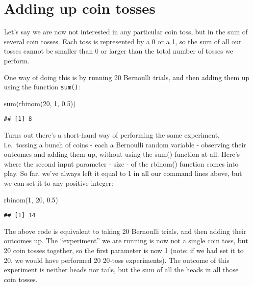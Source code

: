 \documentclass[
]{book}
\newenvironment{Shaded}{\begin{snugshade}}{\end{snugshade}}
\newcommand{\DecValTok}[1]{\textcolor[rgb]{0.00,0.00,0.81}{#1}}
\newcommand{\FloatTok}[1]{\textcolor[rgb]{0.00,0.00,0.81}{#1}}
\newcommand{\FunctionTok}[1]{\textcolor[rgb]{0.00,0.00,0.00}{#1}}
\newcommand{\NormalTok}[1]{#1}
\begin{document}
\hypertarget{adding-up-coin-tosses}{%
\section{Adding up coin tosses}\label{adding-up-coin-tosses}}

Let's say we are now not interested in any particular coin toss, but in the sum of several coin tosses. Each toss is represented by a 0 or a 1, so the sum of all our tosses cannot be smaller than 0 or larger than the total number of tosses we perform.

One way of doing this is by running 20 Bernoulli trials, and then adding them up using the function \texttt{sum()}:

\begin{Shaded}
\begin{Highlighting}[]
\FunctionTok{sum}\NormalTok{(}\FunctionTok{rbinom}\NormalTok{(}\DecValTok{20}\NormalTok{, }\DecValTok{1}\NormalTok{, }\FloatTok{0.5}\NormalTok{))}
\end{Highlighting}
\end{Shaded}

\begin{verbatim}
## [1] 8
\end{verbatim}

Turns out there's a short-hand way of performing the same experiment, i.e.~tossing a bunch of coins - each a Bernoulli random variable - observing their outcomes and adding them up, without using the sum() function at all. Here's where the second input parameter - size - of the rbinom() function comes into play. So far, we've always left it equal to 1 in all our command lines above, but we can set it to any positive integer:

\begin{Shaded}
\begin{Highlighting}[]
\FunctionTok{rbinom}\NormalTok{(}\DecValTok{1}\NormalTok{, }\DecValTok{20}\NormalTok{, }\FloatTok{0.5}\NormalTok{)}
\end{Highlighting}
\end{Shaded}

\begin{verbatim}
## [1] 14
\end{verbatim}

The above code is equivalent to taking 20 Bernoulli trials, and then adding their outcomes up. The ``experiment'' we are running is now not a single coin toss, but 20 coin tosses together, so the first parameter is now 1 (note: if we had set it to 20, we would have performed 20 20-toss experiments). The outcome of this experiment is neither heads nor tails, but the sum of all the heads in all those coin tosses.
\end{document}

